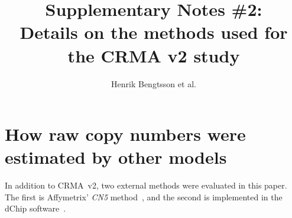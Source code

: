 \documentclass[10pt,a4paper]{article}
\begin{document}
\title{Supplementary Notes \#2:\\Details on the methods used for the CRMA v2 study}
\author{Henrik Bengtsson et al.}
\maketitle
\tableofcontents


\clearpage
\section{How raw copy numbers were estimated by other models}
\label{secOtherMethods}
In addition to CRMA~v2, two external methods were evaluated in this paper.  The first is Affymetrix' \emph{CN5} method~\citep{Affymetrix_2008m}, and the second is implemented in the dChip software~\citep{LiWong_2001}.
\end{document}
